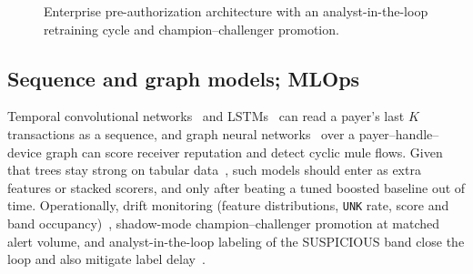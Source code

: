 \documentclass[conference]{IEEEtran}
\begin{document}
\begin{figure}[!t]
\centering
{}
\caption{Enterprise pre-authorization architecture with an analyst-in-the-loop retraining cycle and champion--challenger promotion.}
\label{fig:arch}
\end{figure}

\subsection{Sequence and graph models; MLOps}
Temporal convolutional networks~\cite{bai18} and LSTMs~\cite{hochreiter97} can read a payer's last $K$ transactions as a sequence, and graph neural networks~\cite{kipf17,weber19} over a payer--handle--device graph can score receiver reputation and detect cyclic mule flows. Given that trees stay strong on tabular data~\cite{grinsztajn22}, such models should enter as extra features or stacked scorers, and only after beating a tuned boosted baseline out of time. Operationally, drift monitoring (feature distributions, \texttt{UNK} rate, score and band occupancy)~\cite{gama14}, shadow-mode champion--challenger promotion at matched alert volume, and analyst-in-the-loop labeling of the SUSPICIOUS band close the loop and also mitigate label delay~\cite{dalpozzolo14}.
\end{document}
